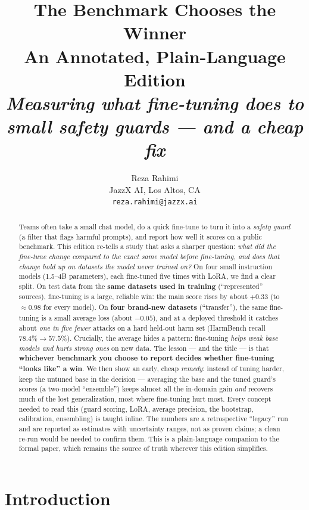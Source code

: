 \documentclass[11pt]{article}
\title{\textbf{The Benchmark Chooses the Winner}\\[2pt]
\large An Annotated, Plain-Language Edition\\[2pt]
\normalsize\itshape Measuring what fine-tuning does to small safety guards --- and a cheap fix}
\author{Reza Rahimi \\ \small JazzX AI, Los Altos, CA \\ \small\texttt{reza.rahimi@jazzx.ai}}
\date{}
\begin{document}
\maketitle

\begin{abstract}
\noindent
Teams often take a small chat model, do a quick fine-tune to turn it into a
\emph{safety guard} (a filter that flags harmful prompts), and report how well it scores
on a public benchmark. This edition re-tells a study that asks a sharper question:
\emph{what did the fine-tune change compared to the exact same model before fine-tuning,
and does that change hold up on datasets the model never trained on?} On four small
instruction models (1.5--4B parameters), each fine-tuned five times with LoRA, we find a
clear split. On test data from the \textbf{same datasets used in training} (``represented''
sources), fine-tuning is a large, reliable win: the main score rises by about
\textbf{$+0.33$} (to $\approx0.98$ for every model). On \textbf{four brand-new datasets}
(``transfer''), the same fine-tuning is a small average loss (about \textbf{$-0.05$}), and
at a deployed threshold it catches about \emph{one in five fewer} attacks on a hard
held-out harm set (HarmBench recall $78.4\%\!\to\!57.5\%$). Crucially, the average hides a
pattern: fine-tuning \emph{helps weak base models and hurts strong ones} on new data. The
lesson --- and the title --- is that \textbf{whichever benchmark you choose to report decides
whether fine-tuning ``looks like'' a win}. We then show an early, cheap \emph{remedy}: instead
of tuning harder, keep the untuned base in the decision --- averaging the base and the tuned
guard's scores (a two-model ``ensemble'') keeps almost all the in-domain gain \emph{and}
recovers much of the lost generalization, most where fine-tuning hurt most. Every concept
needed to read this (guard scoring, LoRA, average precision, the bootstrap, calibration,
ensembling) is taught inline. The numbers are a retrospective ``legacy'' run and are reported
as estimates with uncertainty ranges, not as proven claims; a clean re-run would be needed to
confirm them. This is a plain-language companion to the formal paper, which remains the source
of truth wherever this edition simplifies.
\end{abstract}

\setcounter{tocdepth}{1}
\tableofcontents

\clearpage
\section{Introduction}
\end{document}
